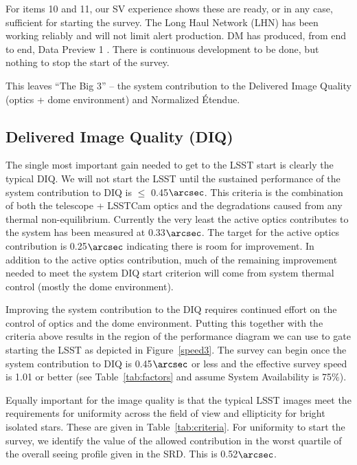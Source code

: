 For items 10 and 11, our SV experience shows these are ready, or in any case, sufficient for starting the survey. The Long Haul Network (LHN) has been working reliably and will not limit alert production. DM has produced, from end to end, Data Preview 1 \citep[DP1; see][]{RTN-095}. There is continuous development to be done, but nothing to stop the start of the survey.  

This leaves ``The Big 3'' -- the system contribution to the Delivered Image Quality (optics + dome environment) and Normalized \'{E}tendue.

\subsection{Delivered Image Quality (DIQ)}

The single most important gain needed to get to the LSST start is clearly the typical DIQ.  We will not start the LSST until the sustained performance of the system contribution to DIQ is $\le$ 0.45$\arcsec$.  This criteria is the combination of both the telescope + LSSTCam optics and the degradations caused from any thermal non-equilibrium. Currently the very least the active optics contributes to the system has been measured at 0.33$\arcsec$.  The target for the active optics contribution is 0.25$\arcsec$ indicating there is room for improvement.  In addition to the active optics contribution, much of the remaining improvement needed to meet the system DIQ start criterion will come from system thermal control (mostly the dome environment).

Improving the system contribution to the DIQ requires continued effort on the control of optics and the dome environment. Putting this together with the criteria above results in the region of the performance diagram we can use to gate starting the LSST as depicted in Figure~\ref{speed3}. The survey can begin once the system contribution to DIQ is 0.45$\arcsec$ or less and the effective survey speed is 1.01 or better (see Table~\ref{tab:factors} and assume System Availability is 75$\%$).

Equally important for the image quality is that the typical LSST images meet the requirements for uniformity across the field of view and ellipticity for bright isolated stars. These are given in Table~\ref{tab:criteria}. For uniformity to start the survey, we identify the value of the allowed contribution in the worst quartile of the overall seeing profile given in the SRD. This is 0.52$\arcsec$. 

